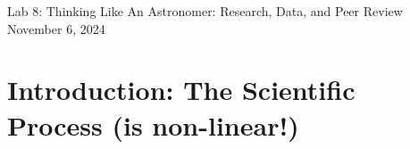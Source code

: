 \documentclass[11pt]{article}%
\begin{document}
\begin{center}
\huge{Lab 8: Thinking Like An Astronomer: Research, Data, and Peer Review}\\ \medskip \Large{November 6, 2024}
\end{center}







\section{Introduction: The Scientific Process (is non-linear!)}
\end{document}
